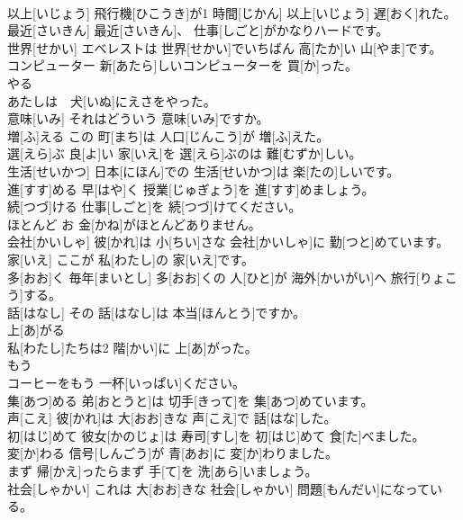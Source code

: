 \documentclass[8pt]{extreport}
\begin{document}
\begin{CJK}{UTF8}{min}
\\	以上[いじょう]	飛行機[ひこうき]が1 時間[じかん] 以上[いじょう] 遅[おく]れた。		
\\	最近[さいきん]	最近[さいきん]、 仕事[しごと]がかなりハードです。		
\\	世界[せかい]	エベレストは 世界[せかい]でいちばん 高[たか]い 山[やま]です。		
\\	コンピューター	新[あたら]しいコンピューターを 買[か]った。		
\\	やる
\\	あたしは　犬[いぬ]にえさをやった。		
\\	意味[いみ]	それはどういう 意味[いみ]ですか。		
\\	増[ふ]える	この 町[まち]は 人口[じんこう]が 増[ふ]えた。		
\\	選[えら]ぶ	良[よ]い 家[いえ]を 選[えら]ぶのは 難[むずか]しい。		
\\	生活[せいかつ]	日本[にほん]での 生活[せいかつ]は 楽[たの]しいです。		
\\	進[すす]める	早[はや]く 授業[じゅぎょう]を 進[すす]めましょう。		
\\	続[つづ]ける	仕事[しごと]を 続[つづ]けてください。		
\\	ほとんど	お 金[かね]がほとんどありません。		
\\	会社[かいしゃ]	彼[かれ]は 小[ちい]さな 会社[かいしゃ]に 勤[つと]めています。		
\\	家[いえ]	ここが 私[わたし]の 家[いえ]です。		
\\	多[おお]く	毎年[まいとし] 多[おお]くの 人[ひと]が 海外[かいがい]へ 旅行[りょこう]する。		
\\	話[はなし]	その 話[はなし]は 本当[ほんとう]ですか。		
\\	上[あ]がる 
\\	私[わたし]たちは2 階[かい]に 上[あ]がった。		
\\	もう
\\	コーヒーをもう 一杯[いっぱい]ください。		
\\	集[あつ]める	弟[おとうと]は 切手[きって]を 集[あつ]めています。		
\\	声[こえ]	彼[かれ]は 大[おお]きな 声[こえ]で 話[はな]した。		
\\	初[はじ]めて	彼女[かのじょ]は 寿司[すし]を 初[はじ]めて 食[た]べました。		
\\	変[か]わる	信号[しんごう]が 青[あお]に 変[か]わりました。		
\\	まず	帰[かえ]ったらまず 手[て]を 洗[あら]いましょう。		
\\	社会[しゃかい]	これは 大[おお]きな 社会[しゃかい] 問題[もんだい]になっている。		

\end{CJK}
\end{document}
